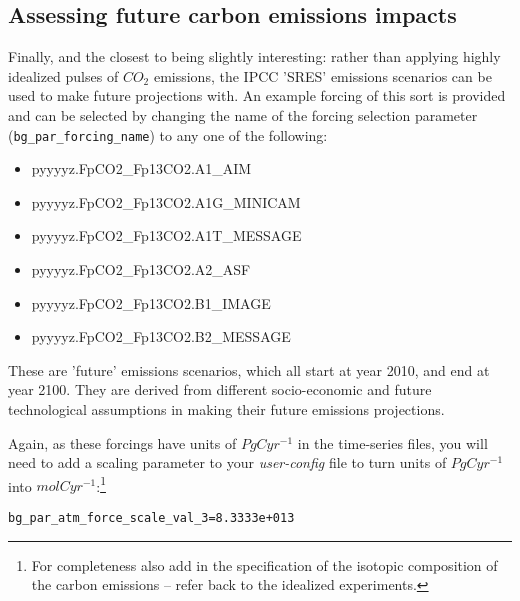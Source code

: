 \subsection{Assessing future carbon emissions impacts}

\noindent Finally, and the closest to being slightly interesting: rather than applying highly idealized pulses  of \(CO_{2}\) emissions, the IPCC 'SRES' emissions scenarios can be used to make future projections with. An example forcing of this sort is provided and can be selected by changing the name of the forcing selection parameter (\texttt{bg\_par\_forcing\_name}) to any one of the following:

\vspace{1mm}
\begin{itemize}[noitemsep]
\item \textsf{\footnotesize pyyyyz.FpCO2\_Fp13CO2.A1\_AIM}
\item \textsf{\footnotesize pyyyyz.FpCO2\_Fp13CO2.A1G\_MINICAM}
\item \textsf{\footnotesize pyyyyz.FpCO2\_Fp13CO2.A1T\_MESSAGE}
\item \textsf{\footnotesize pyyyyz.FpCO2\_Fp13CO2.A2\_ASF}
\item \textsf{\footnotesize pyyyyz.FpCO2\_Fp13CO2.B1\_IMAGE}
\item \textsf{\footnotesize pyyyyz.FpCO2\_Fp13CO2.B2\_MESSAGE}
\end{itemize}
\vspace{1mm}

These are 'future' emissions scenarios, which all start at year 2010, and end at year 2100. They are derived from different socio-economic and future technological assumptions in making their future emissions projections.

\vspace{1mm}

Again, as these forcings have units of \(PgCyr^{-1}\) in the time-series files, you will need to add a scaling parameter to your \textit{user-config} file to turn units of \(PgCyr^{-1}\) into \(mol C yr^{-1}\):\footnote{For completeness also add in the specification of the isotopic composition of the carbon emissions -- refer back to the idealized experiments.}
\vspace{-2pt}\small\begin{verbatim}
bg_par_atm_force_scale_val_3=8.3333e+013
\end{verbatim}\normalsize\vspace{-2pt}

